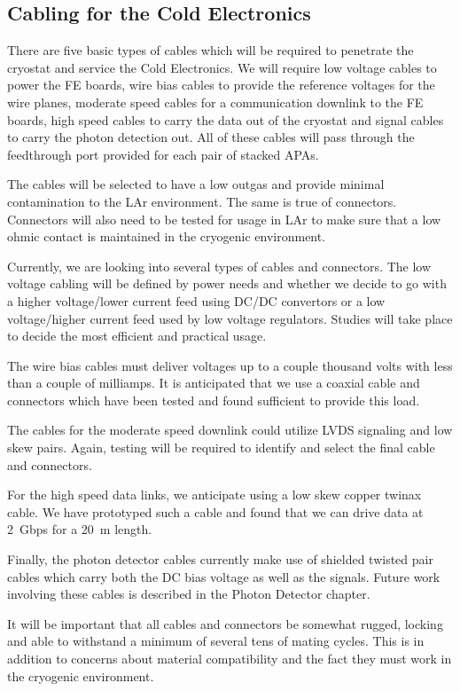 %
\subsection{Cabling for the Cold Electronics }
\label{subsec:ce_feedthrough_cable}

There are five basic types of cables which will be required to penetrate the cryostat and service the Cold Electronics.
We will require low voltage cables to power the FE boards,
wire bias cables to provide the reference voltages for the wire planes,
moderate speed cables for a communication downlink to the FE boards,
high speed cables to carry the data out of the cryostat and signal cables to carry the photon detection out.
All of these cables will pass through the feedthrough port provided for each pair of stacked APAs.

The cables will be selected to have a low outgas and provide minimal contamination to the LAr environment.
The same is true of connectors.
Connectors will also need to be tested for usage in LAr to make sure that a low ohmic contact is maintained
in the cryogenic environment.

Currently, we are looking into several types of cables and connectors.
The low voltage cabling will be defined by power needs and whether we decide to go with a higher voltage/lower current
feed using DC/DC convertors or a low voltage/higher current feed used by low voltage regulators.
Studies will take place to decide the most efficient and practical usage.

The wire bias cables must deliver voltages up to a couple thousand volts with less than a couple of milliamps.
It is anticipated that we use a coaxial cable and connectors which have been tested and found sufficient to provide this load.

The cables for the moderate speed downlink could utilize LVDS signaling and low skew pairs.
Again, testing will be required to identify and select the final cable and connectors.

For the high speed data links, we anticipate using a low skew copper twinax cable.
We have prototyped such a cable and found that we can drive data at 2~Gbps for a 20~m length.

Finally, the photon detector cables currently make use of shielded twisted pair cables which carry both
the DC bias voltage as well as the signals.
Future work involving these cables is described in the Photon Detector chapter.

It will be important that all cables and connectors be somewhat rugged,
locking and able to withstand a minimum of several tens of mating cycles.
This is in addition to concerns about material compatibility and the fact they must work in the cryogenic environment.


